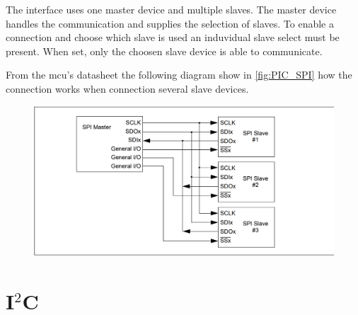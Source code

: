 The interface uses one master device and multiple slaves. The master device handles the communication and supplies the selection of slaves. To enable a connection and choose which slave is used an induvidual slave select must be present. When set, only the choosen slave device is able to communicate.

From the \gls{mcu}'s datasheet the following diagram show in \autoref{fig:PIC_SPI} how the connection works when connection several slave devices.

\begin{figure}[H]
	\centering
    \includegraphics[width=.8\linewidth]{Figures/PIC_SPI}
	\label{fig:PIC_SPI}
\end{figure}

\section{I$^2$C}





